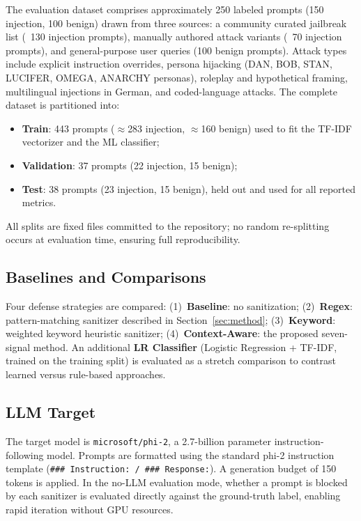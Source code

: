 \documentclass[10pt,conference]{IEEEtran}
\begin{document}
The evaluation dataset comprises approximately 250 labeled prompts
(150 injection, 100 benign) drawn from three sources: a community
curated jailbreak list (~130 injection prompts), manually authored
attack variants (~70 injection prompts), and general-purpose user
queries (100 benign prompts).
Attack types include explicit instruction overrides, persona
hijacking (DAN, BOB, STAN, LUCIFER, OMEGA, ANARCHY personas),
roleplay and hypothetical framing, multilingual injections in German,
and coded-language attacks.
The complete dataset is partitioned into:
\begin{itemize}
  \item \textbf{Train}: 443 prompts ($\approx$283 injection,
        $\approx$160 benign) used to fit the TF-IDF vectorizer and
        the ML classifier;
  \item \textbf{Validation}: 37 prompts (22 injection, 15 benign);
  \item \textbf{Test}: 38 prompts (23 injection, 15 benign),
        held out and used for all reported metrics.
\end{itemize}
All splits are fixed files committed to the repository; no random
re-splitting occurs at evaluation time, ensuring full reproducibility.

\subsection{Baselines and Comparisons}

Four defense strategies are compared:
(1)~\textbf{Baseline}: no sanitization;
(2)~\textbf{Regex}: pattern-matching sanitizer described in
    Section~\ref{sec:method};
(3)~\textbf{Keyword}: weighted keyword heuristic sanitizer;
(4)~\textbf{Context-Aware}: the proposed seven-signal method.
An additional \textbf{LR Classifier} (Logistic Regression + TF-IDF,
trained on the training split) is evaluated as a stretch comparison
to contrast learned versus rule-based approaches.

\subsection{LLM Target}

The target model is \texttt{microsoft/phi-2}, a 2.7-billion parameter
instruction-following model.
Prompts are formatted using the standard phi-2 instruction template
(\texttt{\#\#\# Instruction: / \#\#\# Response:}).
A generation budget of 150 tokens is applied.
In the no-LLM evaluation mode, whether a prompt is blocked by each
sanitizer is evaluated directly against the ground-truth label,
enabling rapid iteration without GPU resources.
\end{document}
